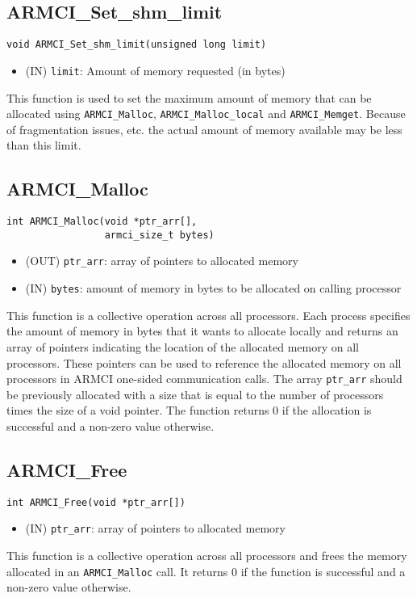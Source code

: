 \documentclass[12pt]{article}
\begin{document}
\subsection{ARMCI\_Set\_shm\_limit}
\begin{verbatim}
void ARMCI_Set_shm_limit(unsigned long limit)
\end{verbatim}
\begin{itemize}
\item (IN) \texttt{limit}: Amount of memory requested (in bytes)
\end{itemize}
This function is used to set the maximum amount of memory that can be allocated
using \texttt{ARMCI\_Malloc}, \texttt{ARMCI\_Malloc\_local} and
\texttt{ARMCI\_Memget}. Because of
fragmentation issues, etc. the actual amount of memory available may be less
than this limit.

\subsection{ARMCI\_Malloc}
\begin{verbatim}
int ARMCI_Malloc(void *ptr_arr[],
                 armci_size_t bytes)
\end{verbatim}
\begin{itemize}
\item (OUT) \texttt{ptr\_arr}: array of pointers to allocated memory
\item (IN) \texttt{bytes}: amount of memory in bytes to be allocated on calling
processor
\end{itemize}
This function is a collective operation across all processors. Each process
specifies the amount of memory in bytes that it wants to allocate locally and
returns an array of pointers indicating the location of the allocated memory on
all processors. These pointers can be used to reference the allocated memory on
all processors in ARMCI one-sided communication calls. The array
\texttt{ptr\_arr} should be previously allocated with a size that is equal to
the number of processors times the size of a void pointer. The function returns
0 if the allocation is successful and a non-zero value otherwise.

\subsection{ARMCI\_Free}
\begin{verbatim}
int ARMCI_Free(void *ptr_arr[])
\end{verbatim}
\begin{itemize}
\item (IN) \texttt{ptr\_arr}: array of pointers to allocated memory
\end{itemize}
This function is a collective operation across all processors and frees the
memory allocated in an \texttt{ARMCI\_Malloc} call. It returns 0 if the function is
successful and a non-zero value otherwise.
\end{document}
